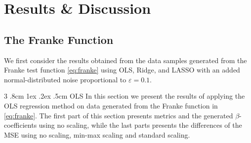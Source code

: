 \documentclass[%
reprint,
amsmath,amssymb,
aps,
pra,
]{revtex4-2}
\makeatletter
\renewcommand{\subsubsection}{%
	\@startsection
	{subsubsection}%
	{3}%
	{\z@}%
	{.8cm \@plus1ex \@minus .2ex}%
	{.5cm}%
	{\normalfont\small\centering}%
}
\makeatother
\begin{document}
\section{Results \& Discussion}

\subsection{The Franke Function}
We first consider the results obtained from the data samples generated from the Franke test function \eqref{eq:franke} using OLS, Ridge, and LASSO with an added normal-distributed noise proportional to \(\varepsilon=0.1\).
\subsubsection{OLS}
In this section we present the results of applying the OLS regression method on data generated from the Franke function in \eqref{eq:franke}. The first part of this section presents metrics and the generated \(\beta\)-coefficients using no scaling, while the last parts presents the differences of the MSE using no scaling, min-max scaling and standard scaling.
\end{document}
